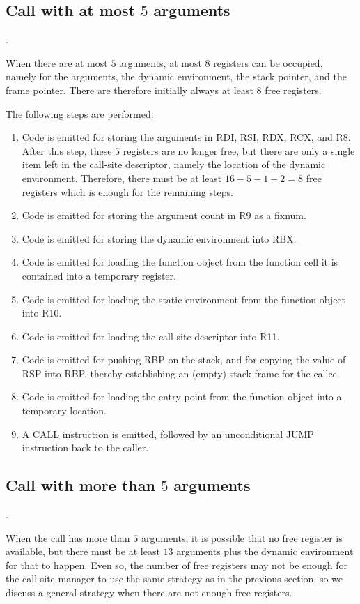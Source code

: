 \subsection{Call with at most $5$ arguments}.

When there are at most $5$ arguments, at most $8$ registers can be
occupied, namely for the arguments, the dynamic environment, the stack
pointer, and the frame pointer.  There are therefore initially always
at least $8$ free registers.

The following steps are performed:

\begin{enumerate}
\item Code is emitted for storing the arguments in RDI, RSI, RDX, RCX,
  and R8.  After this step, these $5$ registers are no longer free,
  but there are only a single item left in the call-site descriptor,
  namely the location of the dynamic environment.  Therefore, there
  must be at least $16 - 5 - 1 - 2 = 8$ free registers which is
  enough for the remaining steps.
\item Code is emitted for storing the argument count in R9 as a fixnum.
\item Code is emitted for storing the dynamic environment into RBX.
\item Code is emitted for loading the function object from the
  function cell it is contained into a temporary register.
\item Code is emitted for loading the static environment from the
  function object into R10.
\item Code is emitted for loading the call-site descriptor into R11.
\item Code is emitted for pushing RBP on the stack, and for copying
  the value of RSP into RBP, thereby establishing an (empty) stack
  frame for the callee.
\item Code is emitted for loading the entry point from the function
  object into a temporary location.
\item A CALL instruction is emitted, followed by an unconditional JUMP
  instruction back to the caller.
\end{enumerate}

\subsection{Call with more than $5$ arguments}.

When the call has more than $5$ arguments, it is possible that no free
register is available, but there must be at least $13$ arguments plus
the dynamic environment for that to happen.  Even so, the number of
free registers may not be enough for the call-site manager to use the
same strategy as in the previous section, so we discuss a general
strategy when there are not enough free registers.

